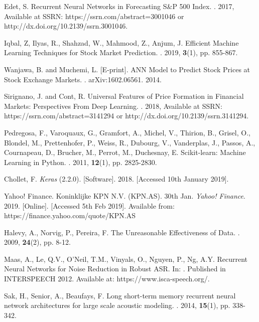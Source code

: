 \documentclass[11pt,a4paper]{article}
\numberwithin{equation}{section}
\begin{document}
\begin{thebibliography}{}
Edet, S.
\newblock Recurrent Neural Networks in Forecasting S\&P 500 Index.
. 2017, Available at SSRN: https://ssrn.com/abstract=3001046 or http://dx.doi.org/10.2139/ssrn.3001046.

Iqbal, Z, Ilyas, R., Shahzad, W., Mahmood, Z., Anjum, J.
\newblock Efficient Machine Learning Techniques for Stock Market Prediction.
. 2019, \textbf{3}(1), pp. 855-867.

Wanjawa, B. and Muchemi, L. [E-print].
\newblock ANN Model to Predict Stock Prices at Stock Exchange Markets.
. arXiv:1602.06561. 2014.

Sirignano, J. and Cont, R.
\newblock Universal Features of Price Formation in Financial Markets: Perspectives From Deep Learning.
. 2018, Available at SSRN: https://ssrn.com/abstract=3141294 or http://dx.doi.org/10.2139/ssrn.3141294.

Pedregosa, F., Varoquaux, G., Gramfort, A., Michel, V., Thirion, B., Grisel, O., Blondel, M., Prettenhofer, P., Weiss, R., Dubourg, V., Vanderplas, J., Passos, A., Cournapeau, D., Brucher, M., Perrot, M., Duchesnay, E.
\newblock Scikit-learn: Machine Learning in Python.
. 2011, \textbf{12}(1), pp. 2825-2830.

Chollet, F. {\em Keras} (2.2.0). [Software]. 2018. [Accessed 10th January 2019].

Yahoo! Finance.
\newblock Koninklijke KPN N.V. (KPN.AS). 30th Jan. {\em Yahoo! Finance}. 2019. [Online]. [Accessed 5th Feb 2019]. \newblock Available from: https://finance.yahoo.com/quote/KPN.AS

Halevy, A., Norvig, P., Pereira, F.
\newblock The Unreasonable Effectiveness of Data.
. 2009, \textbf{24}(2), pp. 8-12.

Maas, A., Le, Q.V., O'Neil, T.M., Vinyals, O., Nguyen, P., Ng, A.Y.
\newblock Recurrent Neural Networks for Noise Reduction in Robust ASR. In:
.
\newblock Published in INTERSPEECH 2012. Available at: https://www.isca-speech.org/.

Sak, H., Senior, A., Beaufays, F.
\newblock Long short-term memory recurrent neural network architectures for large scale acoustic modeling.
. 2014, \textbf{15}(1), pp. 338-342.

\end{thebibliography}
\end{document}
